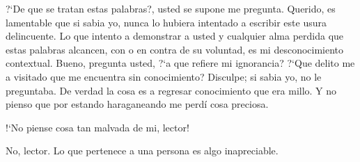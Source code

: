 \documentclass{article}
\begin{document}
	\mbox{?`}De que se tratan estas palabras?, usted se supone me pregunta. Querido, es lamentable que si sabia yo, nunca lo hubiera intentado a escribir este usura delincuente. Lo que intento a demonstrar a usted y cualquier alma perdida que estas palabras alcancen, con o en contra de su voluntad, es mi desconocimiento contextual. Bueno, pregunta usted, \mbox{?`}a que refiere mi ignorancia? \mbox{?`}Que delito me a visitado que me encuentra sin conocimiento? Disculpe; si sabia yo, no le preguntaba. De verdad la cosa es a regresar conocimiento que era millo. Y no pienso que por estando haraganeando me perd\'{i} cosa preciosa.
	
	\mbox{!`}No piense cosa tan malvada de mi, lector!
	
	No, lector. Lo que pertenece a una persona es algo inapreciable.
	
	
	
\end{document}
